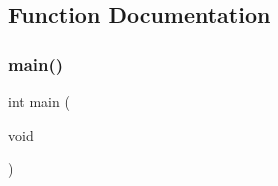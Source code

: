 \subsection{Function Documentation}
\mbox{\label{prueba_8c_ae66f6b31b5ad750f1fe042a706a4e3d4}} 
\subsubsection{main()}
{\footnotesize\ttfamily int main (\begin{DoxyParamCaption}\item[{void}]{ }\end{DoxyParamCaption})}

